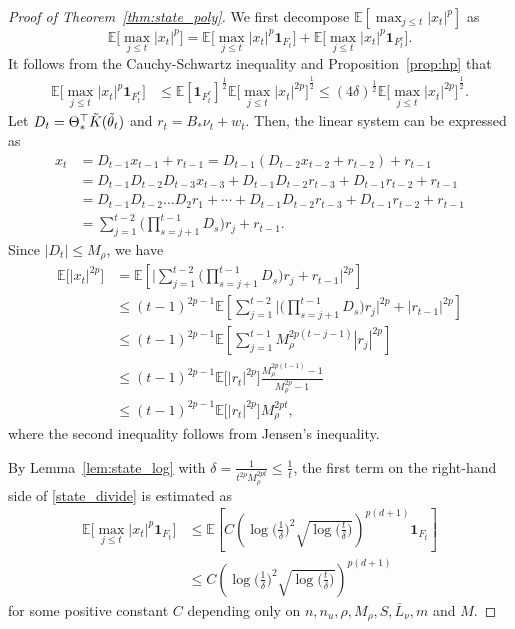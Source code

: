 \documentclass[11pt]{article}
\theoremstyle{plain}
\theoremstyle{definition}
\theoremstyle{remark}
\begin{document}
\begin{proof}[Proof of Theorem~\ref{thm:state_poly}]
We first decompose $\mathbb{E}[\max_{j\leq t}|x_t|^p]$ as
 \begin{equation}\label{state_divide}
    \mathbb{E} \Big [\max_{j\leq t}|x_t|^p \Big ] = \mathbb{E}\Big [\max_{j\leq t}|x_t|^p\mathbf{1}_{F_t} \Big ] +\mathbb{E}\Big [\max_{j\leq t}|x_t|^p\mathbf{1}_{F_t^c} \Big ].
\end{equation}
It follows from the Cauchy-Schwartz inequality
and
Proposition~\ref{prop:hp} that
\begin{align*}
    \mathbb{E}\Big [\max_{j\leq t}|x_t|^p\mathbf{1}_{F_t^c}\Big ] &\leq {\mathbb{E}[\mathbf{1}_{F_t^c}]}^{\frac{1}{2}} {\mathbb{E}\Big [\max_{j\leq t}|x_t|^{2p}\Big ]}^{\frac{1}{2}}  \leq {(4\delta)}^{\frac{1}{2}} {\mathbb{E}\Big [\max_{j\leq t}|x_t|^{2p} \Big]}^{\frac{1}{2}}.
\end{align*}
Let $D_t = \Theta_*^{\top}\tilde{K}(\Tilde{\theta}_t)$ and $r_t = B_*\nu_t + w_t$. Then, the linear system can be expressed as
\begin{align*}
    x_t &= D_{t-1}x_{t-1}+r_{t-1}  = D_{t-1}(D_{t-2}x_{t-2}+r_{t-2})+ r_{t-1}\\
    & = D_{t-1}D_{t-2}D_{t-3}x_{t-3} + D_{t-1}D_{t-2}r_{t-3}+ D_{t-1}r_{t-2}+r_{t-1}\\
    & = D_{t-1}D_{t-2}\ldots D_2r_1 + \cdots + D_{t-1}D_{t-2}r_{t-3}+ D_{t-1}r_{t-2} + r_{t-1}\\
    & = \sum_{j=1}^{t-2}\bigg(\prod_{s=j+1}^{t-1}D_s\bigg)r_j +r_{t-1}.
\end{align*}
Since $|D_t| \leq M_{\rho}$, we have
\begin{align*}
    \mathbb{E}\big [|x_t|^{2p}\big ] &= \mathbb{E}\left [\bigg |\sum_{j=1}^{t-2}\bigg(\prod_{s=j+1}^{t-1}D_s\bigg)r_j +r_{t-1} \bigg |^{2p} \right ]\\
    & \leq (t-1)^{2p-1}\mathbb{E} \left [\sum_{j=1}^{t-2}\bigg |\bigg(\prod_{s=j+1}^{t-1}D_s\bigg)r_j \bigg|^{2p}+|r_{t-1} |^{2p} \right ]\\
    & \leq (t-1)^{2p-1}\mathbb{E}\left [\sum_{j=1}^{t-1}M_{\rho}^{2p(t-j-1)}|r_j|^{2p} \right]\\
    & \leq (t-1)^{2p-1}\mathbb{E}\big [|r_t|^{2p}\big ]\frac{M_{\rho}^{2p(t-1)}-1}{M^{2p}_{\rho}-1}\\
    & \leq (t-1)^{2p-1}\mathbb{E}\big [|r_t|^{2p}\big ] M_\rho^{2pt},
\end{align*}
where the second inequality follows from Jensen's inequality.

By Lemma~\ref{lem:state_log} with $\delta = \frac{1}{t^{2p} M_\rho^{2pt}} \leq \frac{1}{t}$, the first term on the right-hand side of \eqref{state_divide} is estimated as
\begin{align*}
    \mathbb{E}\Big [\max_{j \leq t}|x_t|^p\mathbf{1}_{F_t}\Big ] &\leq \mathbb{E}\left [C\left(\log\bigg(\frac{1}{\delta}\bigg)^2\sqrt{\log\bigg(\frac{t}{\delta}\bigg)}\right)^{p(d+1)}\mathbf{1}_{F_t}\right]\\
    &\leq C\left(\log\bigg(\frac{1}{\delta}\bigg)^2\sqrt{\log\bigg(\frac{t}{\delta}\bigg)}\right)^{p(d+1)}
\end{align*}
for some positive constant $C$ depending only on $n,n_u,\rho,M_{\rho},S,\bar{L}_{\nu}, m$ and $M$.


\end{proof}
\end{document}
